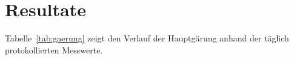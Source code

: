 %
%
%
%

\chapter{Resultate}
\label{kap:resultate}

Tabelle~\ref{tab:gaerung} zeigt den Verlauf der Hauptgärung anhand der
täglich protokollierten Messwerte.

